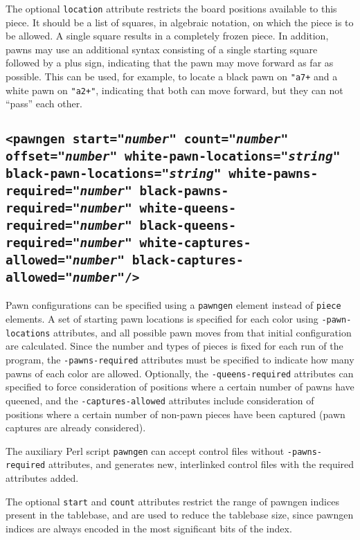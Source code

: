 \documentclass[11pt]{article}
\begin{document}
The optional {\tt location} attribute restricts the board positions
available to this piece.  It should be a list of squares, in algebraic
notation, on which the piece is to be allowed.  A single square
results in a completely frozen piece.  In addition, pawns may use an
additional syntax consisting of a single starting square followed by a
plus sign, indicating that the pawn may move forward as far as
possible.  This can be used, for example, to locate a black pawn on
{\tt "a7+} and a white pawn on {\tt "a2+"}, indicating that both can
move forward, but they can not ``pass'' each other.

\subsection{\tt <pawngen start="{\it number}" count="{\it number}" offset="{\it number}" \hfil\break\hbox{\qquad} white-pawn-locations="{\it string}" black-pawn-locations="{\it string}" \hfil\break\hbox{\qquad} white-pawns-required="{\it number}" black-pawns-required="{\it number}" \hfil\break\hbox{\qquad} white-queens-required="{\it number}" black-queens-required="{\it number}" \hfil\break\hbox{\qquad} white-captures-allowed="{\it number}" black-captures-allowed="{\it number}"/>}

Pawn configurations can be specified using a {\tt pawngen} element
instead of {\tt piece} elements.  A set of starting pawn locations is
specified for each color using {\tt *-pawn-locations} attributes, and
all possible pawn moves from that initial configuration are
calculated.  Since the number and types of pieces is fixed for each
run of the program, the {\tt *-pawns-required} attributes must be
specified to indicate how many pawns of each color are allowed.
Optionally, the {\tt *-queens-required} attributes can specified to
force consideration of positions where a certain number of pawns have
queened, and the {\tt *-captures-allowed} attributes include
consideration of positions where a certain number of non-pawn pieces
have been captured (pawn captures are already considered).

The auxiliary Perl script {\tt pawngen} can accept control files
without {\tt *-pawns-required} attributes, and generates new,
interlinked control files with the required attributes added.

The optional {\tt start} and {\tt count} attributes restrict the
range of pawngen indices present in the tablebase, and are used
to reduce the tablebase size, since pawngen indices are always
encoded in the most significant bits of the index.
\end{document}

